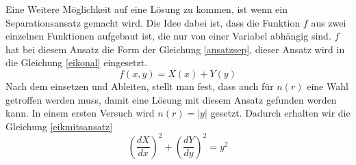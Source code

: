 \begin{refsection}
Eine Weitere Möglichkeit auf eine Lösung zu kommen, ist wenn ein Separationsansatz gemacht wird. Die Idee dabei ist, dass die Funktion $f$ aus zwei einzelnen Funktionen aufgebaut ist, die nur von einer Variabel abhängig sind. $f$ hat bei diesem Ansatz die Form der Gleichung \eqref{ansatzsep}, dieser Ansatz wird in die Gleichung \eqref{eikonal} eingesetzt.  
\begin{equation}\label{ansatzsep}
f(x,y)=X(x) + Y(y)
\end{equation}
Nach dem einsetzen und Ableiten, stellt man fest, dass auch für $n(r)$ eine Wahl getroffen werden muss, damit eine Lösung mit diesem Ansatz gefunden werden kann. In einem ersten Versuch wird $n(r)=\vert y\vert$ gesetzt. Dadurch erhalten wir die Gleichung \eqref{eikmitsansatz}
\begin{equation}\label{eikmitsansatz}
\left(\dfrac{dX}{dx}\right) ^{2}+\left(\dfrac{dY}{dy}\right) ^{2}=y^{2}
\end{equation}

\printbibliography[heading=subbibliography]
\end{refsection}















